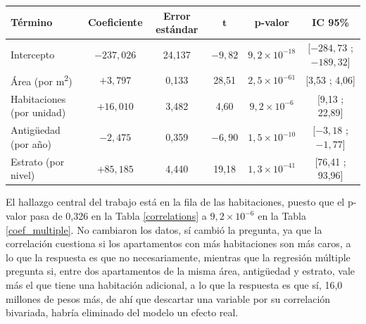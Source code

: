         \begin{strip}
            \centering
            \label{coef_multiple}
            \begin{center}
                \begin{tabular}{|l|c|c|c|c|c|}
                    \hline
                    \textbf{Término} & \textbf{Coeficiente} &
                    \textbf{Error estándar} & $\mathbf{t}$ & \textbf{p-valor} &
                    \textbf{IC 95\%} \\
                    \hline
                    Intercepto & $-237{,}026$ & 24,137 & $-9{,}82$ &
                    $9{,}2 \times 10^{-18}$ & [$-284{,}73$ ; $-189{,}32$] \\
                    \hline
                    Área (por m\textsuperscript{2}) & $+3{,}797$ & 0,133 & 28,51 &
                    $2{,}5 \times 10^{-61}$ & [3,53 ; 4,06] \\
                    \hline
                    Habitaciones (por unidad) & $+16{,}010$ & 3,482 & 4,60 &
                    $9{,}2 \times 10^{-6}$ & [9,13 ; 22,89] \\
                    \hline
                    Antigüedad (por año) & $-2{,}475$ & 0,359 & $-6{,}90$ &
                    $1{,}5 \times 10^{-10}$ & [$-3{,}18$ ; $-1{,}77$] \\
                    \hline
                    Estrato (por nivel) & $+85{,}185$ & 4,440 & 19,18 &
                    $1{,}3 \times 10^{-41}$ & [76,41 ; 93,96] \\
                    \hline
                \end{tabular}
            \end{center}
        \end{strip}

        El hallazgo central del trabajo está en la fila de las habitaciones,
        puesto que el p-valor pasa de 0,326 en la Tabla \ref{correlations} a
        $9{,}2 \times 10^{-6}$ en la Tabla \ref{coef_multiple}. No cambiaron los
        datos, sí cambió la pregunta, ya que la correlación cuestiona si los
        apartamentos con más habitaciones son más caros, a lo que la respuesta es
        que no necesariamente, mientras que la regresión múltiple pregunta si,
        entre dos apartamentos de la misma área, antigüedad y estrato, vale más el
        que tiene una habitación adicional, a lo que la respuesta es que sí, 16,0
        millones de pesos más, de ahí que descartar una variable por su correlación
        bivariada, habría eliminado del modelo un efecto real.

